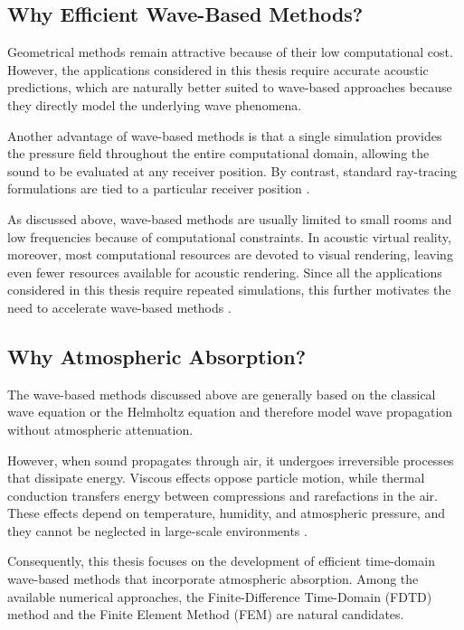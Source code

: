\documentclass{Configuration_Files/PoliMi3i_thesis}
\begin{document}
\subsection{Why Efficient Wave-Based Methods?}
Geometrical methods remain attractive because of their low computational cost. However, the applications considered in this thesis require accurate acoustic predictions, which are naturally better suited to wave-based approaches because they directly model the underlying wave phenomena.

Another advantage of wave-based methods is that a single simulation provides the pressure field throughout the entire computational domain, allowing the sound to be evaluated at any receiver position. By contrast, standard ray-tracing formulations are tied to a particular receiver position \citep{funkhouser_beam_1998}.

As discussed above, wave-based methods are usually limited to small rooms and low frequencies because of computational constraints. In acoustic virtual reality, moreover, most computational resources are devoted to visual rendering, leaving even fewer resources available for acoustic rendering. Since all the applications considered in this thesis require repeated simulations, this further motivates the need to accelerate wave-based methods \citep{kleiner_auralization_1993,council_virtual_1995,savioja_creating_1999,sampedro_llopis_reduced_2023}.

\subsection{Why Atmospheric Absorption?}
The wave-based methods discussed above are generally based on the classical wave equation or the Helmholtz equation and therefore model wave propagation without atmospheric attenuation.

However, when sound propagates through air, it undergoes irreversible processes that dissipate energy. Viscous effects oppose particle motion, while thermal conduction transfers energy between compressions and rarefactions in the air. These effects depend on temperature, humidity, and atmospheric pressure, and they cannot be neglected in large-scale environments \citep{evans_atmospheric_1972}.

Consequently, this thesis focuses on the development of efficient time-domain wave-based methods that incorporate atmospheric absorption. Among the available numerical approaches, the Finite-Difference Time-Domain (FDTD) method and the Finite Element Method (FEM) are natural candidates.
%
\end{document}
